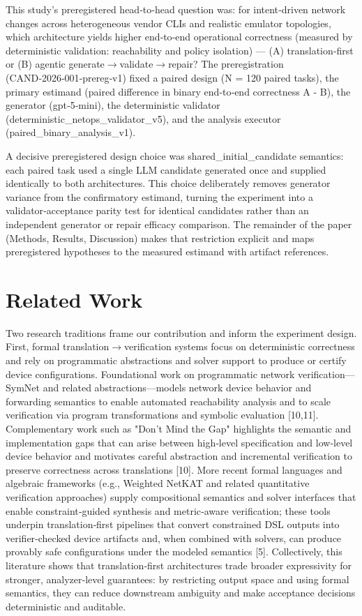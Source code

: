 \documentclass[conference]{IEEEtran}
\begin{document}
This study's preregistered head‑to‑head question was: for intent‑driven network changes across heterogeneous vendor CLIs and realistic emulator topologies, which architecture yields higher end‑to‑end operational correctness (measured by deterministic validation: reachability and policy isolation) --- (A) translation‑first or (B) agentic generate\ensuremath{\rightarrow}validate\ensuremath{\rightarrow}repair? The preregistration (CAND‑2026‑001‑prereg‑v1) fixed a paired design (N = 120 paired tasks), the primary estimand (paired difference in binary end‑to‑end correctness A - B), the generator (gpt‑5‑mini), the deterministic validator (deterministic\_netops\_validator\_v5), and the analysis executor (paired\_binary\_analysis\_v1).

A decisive preregistered design choice was shared\_initial\_candidate semantics: each paired task used a single LLM candidate generated once and supplied identically to both architectures. This choice deliberately removes generator variance from the confirmatory estimand, turning the experiment into a validator‑acceptance parity test for identical candidates rather than an independent generator or repair efficacy comparison. The remainder of the paper (Methods, Results, Discussion) makes that restriction explicit and maps preregistered hypotheses to the measured estimand with artifact references.

\section{Related Work}
Two research traditions frame our contribution and inform the experiment design. First, formal translation\ensuremath{\rightarrow}verification systems focus on deterministic correctness and rely on programmatic abstractions and solver support to produce or certify device configurations. Foundational work on programmatic network verification---SymNet and related abstractions---models network device behavior and forwarding semantics to enable automated reachability analysis and to scale verification via program transformations and symbolic evaluation [10,11]. Complementary work such as "Don't Mind the Gap" highlights the semantic and implementation gaps that can arise between high‑level specification and low‑level device behavior and motivates careful abstraction and incremental verification to preserve correctness across translations [10]. More recent formal languages and algebraic frameworks (e.g., Weighted NetKAT and related quantitative verification approaches) supply compositional semantics and solver interfaces that enable constraint‑guided synthesis and metric‑aware verification; these tools underpin translation‑first pipelines that convert constrained DSL outputs into verifier‑checked device artifacts and, when combined with solvers, can produce provably safe configurations under the modeled semantics [5]. Collectively, this literature shows that translation‑first architectures trade broader expressivity for stronger, analyzer‑level guarantees: by restricting output space and using formal semantics, they can reduce downstream ambiguity and make acceptance decisions deterministic and auditable.
\end{document}
